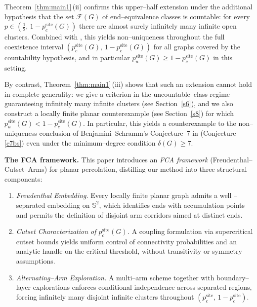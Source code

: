 \documentclass[11pt]{amsart}
\theoremstyle{plain}
\numberwithin{equation}{section}
\numberwithin{figure}{section}
\begin{document}
Theorem~\ref{thm:main1}\,(ii) confirms this upper--half extension under the additional hypothesis
that the set $\mathcal F(G)$ of end--equivalence classes is countable: for every
$p\in(\tfrac12,\,1-p_c^{\mathrm{site}}(G))$ there are almost surely infinitely many infinite open clusters.
Combined with \cite{GHZ25}, this yields non--uniqueness throughout the full coexistence interval
$(p_c^{\mathrm{site}}(G),\,1-p_c^{\mathrm{site}}(G))$ for all graphs covered by the countability hypothesis,
and in particular $p_u^{\mathrm{site}}(G)\ge 1-p_c^{\mathrm{site}}(G)$ in this setting.

By contrast, Theorem~\ref{thm:main1}\,(iii) shows that such an extension cannot hold in complete generality:
we give a criterion in the uncountable--class regime guaranteeing infinitely many infinite clusters
(see Section~\ref{s6}), and we also construct a locally finite planar counterexample
(see Section~\ref{s8}) for which $p_u^{\mathrm{site}}(G)<1-p_c^{\mathrm{site}}(G)$.
In particular, this yields a counterexample to the non--uniqueness conclusion of
Benjamini--Schramm's Conjecture~7 in \cite{bs96} (Conjecture \ref{c7bs}) even under the minimum--degree condition $\delta(G)\ge 7$.









\medskip
\noindent\textbf{The FCA framework.}
This paper introduces an \emph{FCA framework} (Freudenthal–Cutset–Arms) for planar percolation, distilling our method into three structural components:
\begin{enumerate}
\item[\textbf{(F1)}] \emph{Freudenthal Embedding.}
Every locally finite planar graph admits a well – separated embedding on \(\mathbb{S}^2\), which identifies ends with accumulation points and permits the definition of disjoint arm corridors aimed at distinct ends.
\item[\textbf{(F2)}] \emph{Cutset Characterization of \(p_c^{\mathrm{site}}(G)\).}
A coupling formulation via supercritical cutset bounds yields uniform control of connectivity probabilities and an analytic handle on the critical threshold, without transitivity or symmetry assumptions.
\item[\textbf{(F3)}] \emph{Alternating–Arm Exploration.}
A multi–arm scheme together with boundary–layer explorations enforces conditional independence across separated regions, forcing infinitely many disjoint infinite clusters throughout \((p_c^{\mathrm{site}},\,1-p_c^{\mathrm{site}})\).
\end{enumerate}
\end{document}
